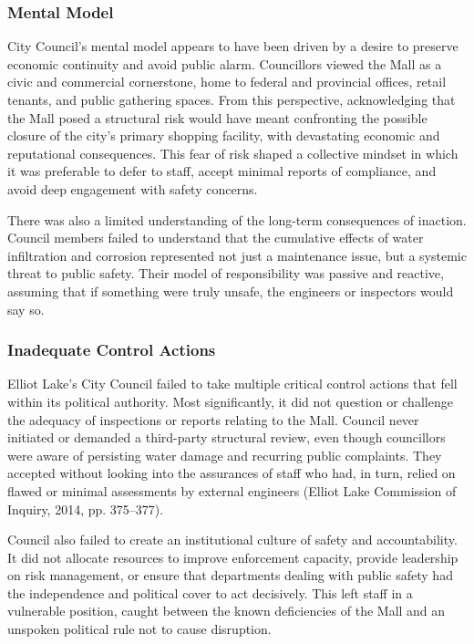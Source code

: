 \documentclass[12pt]{article}
\begin{document}
\subsubsection*{Mental Model}
City Council’s mental model appears to have been driven by a desire to preserve economic continuity and avoid public alarm. Councillors viewed the Mall as a civic and commercial cornerstone, home to federal and provincial offices, retail tenants, and public gathering spaces. From this perspective, acknowledging that the Mall posed a structural risk would have meant confronting the possible closure of the city’s primary shopping facility, with devastating economic and reputational consequences. This fear of risk shaped a collective mindset in which it was preferable to defer to staff, accept minimal reports of compliance, and avoid deep engagement with safety concerns.

There was also a limited understanding of the long-term consequences of inaction. Council members failed to understand that the cumulative effects of water infiltration and corrosion represented not just a maintenance issue, but a systemic threat to public safety. Their model of responsibility was passive and reactive, assuming that if something were truly unsafe, the engineers or inspectors would say so.

\subsubsection*{Inadequate Control Actions}
Elliot Lake’s City Council failed to take multiple critical control actions that fell within its political authority. Most significantly, it did not question or challenge the adequacy of inspections or reports relating to the Mall. Council never initiated or demanded a third-party structural review, even though councillors were aware of persisting water damage and recurring public complaints. They accepted without looking into the assurances of staff who had, in turn, relied on flawed or minimal assessments by external engineers (Elliot Lake Commission of Inquiry, 2014, pp. 375–377).

Council also failed to create an institutional culture of safety and accountability. It did not allocate resources to improve enforcement capacity, provide leadership on risk management, or ensure that departments dealing with public safety had the independence and political cover to act decisively. This left staff in a vulnerable position, caught between the known deficiencies of the Mall and an unspoken political rule not to cause disruption.
\end{document}

